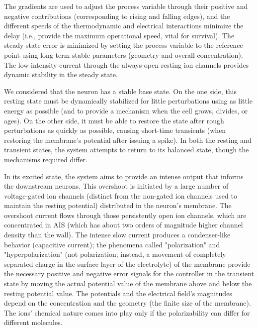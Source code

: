 The gradients are used to adjust the process variable through their positive and negative contributions (corresponding to rising and falling edges), and the different speeds of the thermodynamic and electrical interactions minimize the delay (i.e., provide the maximum operational speed, vital for survival).
The steady-state error is minimized by setting the process variable to the reference point using long-term stable parameters (geometry and overall concentration). The low-intensity current through the always-open resting ion channels provides dynamic stability in the steady state.

We considered that the neuron has a stable base state. On the one side, this resting state must be dynamically stabilized for little perturbations using as little energy as possible
(and to provide a mechanism when the cell grows, divides, or ages). On the other side, it must be able to restore the state after rough perturbations as quickly as possible, causing short-time transients (when restoring the
membrane's potential after issuing a spike).
In both the resting and transient states, the system attempts to return to its balanced state, though the mechanisms required differ. 

In its excited state, the system aims to provide an intense output that informs the downstream neurons.
This overshoot is initiated by a large number of voltage-gated ion channels (distinct from the non-gated ion channels used to maintain the resting potential) distributed in the neuron's membrane.
The overshoot current flows through those persistently open ion channels, which are concentrated in \gls{AIS} (which has about two orders of magnitude higher channel density than the wall).
The intense slow current produces a condenser-like behavior (capacitive current); the phenomena called "polarization" and "hyperpolarization" (not polarization; instead, a movement of completely separated charge in the surface layer of the electrolyte) of the membrane provide the necessary positive and negative error signals for the controller in the transient state by moving the actual potential value of the membrane above and below the resting potential value. The potentials and the electrical field's magnitudes 
depend on the concentration and the geometry (the finite size of the membrane). The ions' chemical nature comes into play only if the polarizability can differ 
for different molecules.


